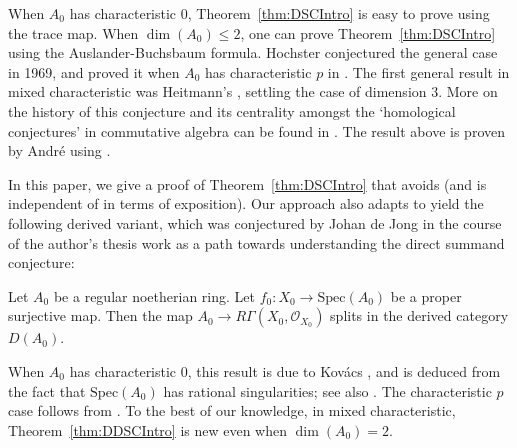 \documentclass[10pt,reqno]{amsart}
\begin{document}
When $A_0$ has characteristic $0$, Theorem~\ref{thm:DSCIntro} is easy to prove using the trace map. When $\dim(A_0) \leq 2$, one can prove Theorem~\ref{thm:DSCIntro} using the Auslander-Buchsbaum formula. Hochster conjectured the general case in 1969, and proved it when $A_0$ has characteristic $p$ in  \cite{HochsterDSC}. The first general result in mixed characteristic was Heitmann's \cite{HeitmannDSC3}, settling the case of dimension $3$. More on the history of this conjecture and its centrality amongst the `homological conjectures' in commutative algebra can be found in \cite{HochsterHomological}. The result above is proven by Andr\'e \cite{AndreDSC} using \cite{AndrePAL}. 

In this paper, we give a proof of Theorem~\ref{thm:DSCIntro} that avoids \cite{AndrePAL} (and is independent of \cite{AndreDSC} in terms of exposition). Our approach also adapts to yield the following derived variant, which was conjectured by Johan de Jong in the course of the author's thesis work \cite{BhattPosCharpdiv, BhattMixedCharpdiv} as a path towards understanding the direct summand conjecture:

\begin{theorem}
\label{thm:DDSCIntro}
Let $A_0$ be a regular noetherian ring. Let $f_0:X_0 \to \mathrm{Spec}(A_0)$ be a proper surjective map. Then the map $A_0 \to R\Gamma(X_0, \mathcal{O}_{X_0})$ splits in the derived category $D(A_0)$.
\end{theorem}

When $A_0$ has characteristic $0$, this result is due to Kov\'acs \cite{KovacsRational}, and is deduced from the fact that $\mathrm{Spec}(A_0)$ has rational singularities; see also \cite[Theorem 2.12]{BhattPosCharpdiv}. The characteristic $p$ case follows from \cite[Theorem 1.4 \& Example 2.3]{BhattPosCharpdiv}. To the best of our knowledge, in mixed characteristic, Theorem~\ref{thm:DDSCIntro} is new even when $\dim(A_0) = 2$.
\end{document}
